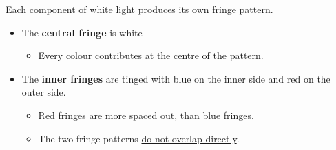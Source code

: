 Each component of white light produces its own fringe pattern.
\begin{itemize}
    \item The \textbf{central fringe} is white
        \begin{itemize}
            \item Every colour contributes at the centre of the pattern.
        \end{itemize}
    \item The \textbf{inner fringes} are tinged with blue on the inner side and red on the outer side.
        \begin{itemize}
            \item Red fringes are more spaced out, than blue fringes.
            \item The two fringe patterns \underline{do not overlap directly}.
        \end{itemize}
\end{itemize}
